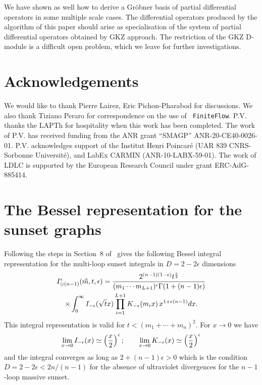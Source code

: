 \documentclass[a4paper,12pt]{article}
\numberwithin{equation}{section}
\numberwithin{figure}{section}
\def\su{\circleddash}
\begin{document}
We have shown as well how to derive a Gr\"obner basis of partial
differential operators in some multiple scale cases. The differential
operators produced by the algorithm of this paper should arise as
specialisation of the system of partial differential operators
obtained by GKZ  approach. The restriction of the GKZ  D-module is a
difficult open problem, which we leave for further investigations.


\section*{Acknowledgements}
We would like to thank Pierre Lairez,  Eric Pichon-Pharabod  for discussions. We also thank Tiziano Peraro for correspondence on the use of {\tt
	FiniteFlow}. P.V. thanks the LAPTh for hospitality when this
      work has been completed.
The work of P.V. has received funding from the ANR grant ``SMAGP''
ANR-20-CE40-0026-01. P.V. acknowledges support of the Institut Henri
Poincar\'e (UAR 839 CNRS-Sorbonne Universit\'e), and LabEx CARMIN
(ANR-10-LABX-59-01). The work of LDLC is  supported by 
the European Research Council under grant ERC-AdG-885414. 


\appendix\section{The Bessel representation for the sunset graphs}\label{sec:bessel}


Following the steps in Section~8 of~\cite{Vanhove:2014wqa}
gives the following Bessel integral representation for the multi-loop
sunset integrals in  $D=2-2\epsilon$ dimensions
\begin{multline}
  I_{\su(n-1)}^\epsilon(\vec m,t,\epsilon)=
  {2^{(n-1) (1-\epsilon)} t^{\epsilon\over2} \over    (m_1\cdots m_{L+1})^{\epsilon}
  \Gamma(1+(n-1)\epsilon)}\cr\times\int_0^\infty I_{-\epsilon}(\sqrt{t} x)
  \prod_{i=1}^{L+1}K_{-\epsilon}(m_ix)\,  x^{1+\epsilon(n-1)}dx.
\end{multline}
This integral representation is valid for  $t<(m_1+\cdots +m_{n})^2$.
%
For $x\to0$ we have
\begin{equation}
  \lim_{x\to0} I_{-\epsilon}(x)\simeq \left(x\over2\right)^{\epsilon};    \qquad
  \lim_{x\to0} K_{-\epsilon}(x)   \simeq \left(x\over2\right)^{\epsilon}
\end{equation}
and the integral converges as long as $2+(n-1)\epsilon>0$ which is the
condition $D=2-2\epsilon< 2n/(n-1)$ for the absence of ultraviolet divergences
for the $n-1$-loop massive sunset.
\end{document}
